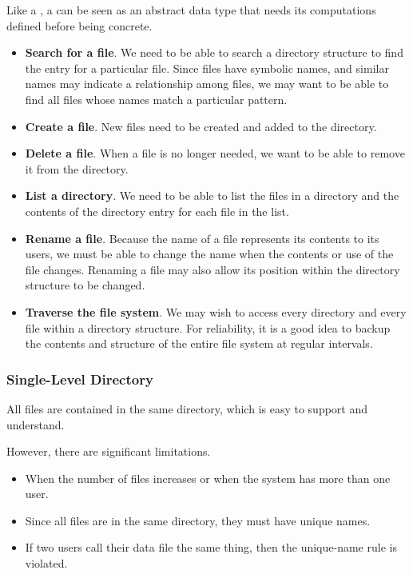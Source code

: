 Like a , a  can be seen as an abstract data type that needs its computations defined before being concrete.
\begin{itemize}[noitemsep]
\item \textbf{Search for a file}.
  We need to be able to search a directory structure to find the entry for a particular file.
  Since files have symbolic names, and similar names may indicate a relationship among files, we may want to be able to find all files whose names match a particular pattern.

\item \textbf{Create a file}.
  New files need to be created and added to the directory.

\item \textbf{Delete a file}.
  When a file is no longer needed, we want to be able to remove it from the directory.

\item \textbf{List a directory}.
  We need to be able to list the files in a directory and the contents of the directory entry for each file in the list.

\item \textbf{Rename a file}.
  Because the name of a file represents its contents to its users, we must be able to change the name when the contents or use of the file changes.
  Renaming a file may also allow its position within the directory structure to be changed.

\item \textbf{Traverse the file system}.
  We may wish to access every directory and every file within a directory structure.
  For reliability, it is a good idea to backup the contents and structure of the entire file system at regular intervals.
\end{itemize}

\subsubsection{Single-Level Directory}\label{subsubsec:Single_Level_Directory}
All files are contained in the same directory, which is easy to support and understand.

However, there are significant limitations.
\begin{itemize}[noitemsep]
\item When the number of files increases or when the system has more than one user.
\item Since all files are in the same directory, they must have unique names.
\item If two users call their data file the same thing, then the unique-name rule is violated.
\end{itemize}

